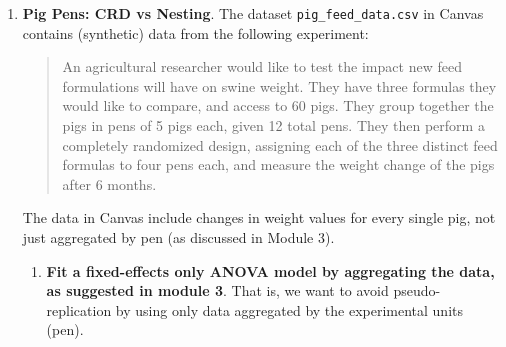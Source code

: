 \documentclass[10pt,twoside]{article}\usepackage[]{graphicx}\usepackage[dvipsnames,svgnames,table]{xcolor}
\makeatletter
\newcommand{\hlsng}[1]{\textcolor[rgb]{0.192,0.494,0.8}{#1}}%
\newcommand{\hlcom}[1]{\textcolor[rgb]{0.678,0.584,0.686}{\textit{#1}}}%
\newcommand{\hldef}[1]{\textcolor[rgb]{0.345,0.345,0.345}{#1}}%
\newcommand{\hlkwb}[1]{\textcolor[rgb]{0.69,0.353,0.396}{#1}}%
\newcommand{\hlkwd}[1]{\textcolor[rgb]{0.737,0.353,0.396}{\textbf{#1}}}%
\newenvironment{kframe}{%
 \def\at@end@of@kframe{}%
 \ifinner\ifhmode%
  \def\at@end@of@kframe{\end{minipage}}%
  \begin{minipage}{\columnwidth}%
 \fi\fi%
 \def\FrameCommand##1{\hskip\@totalleftmargin \hskip-\fboxsep
 \colorbox{shadecolor}{##1}\hskip-\fboxsep
     \hskip-\linewidth \hskip-\@totalleftmargin \hskip\columnwidth}%
 \MakeFramed {\advance\hsize-\width
   \@totalleftmargin\z@ \linewidth\hsize
   \@setminipage}}%
 {\par\unskip\endMakeFramed%
 \at@end@of@kframe}
\newenvironment{knitrout}{}{} %
\makeatother
\begin{document}
\begin{enumerate}
\begin{enumerate}
 \item The dataset \texttt{nestedDesignData.csv} contains 72 observations generated from this exact design. Load the data and use \texttt{lmer()} from the \texttt{lme4} package to fit the mixed-effects model you specified in part (a). Print the summary of the model, and analyze the fixed treatment effects using the \texttt{anova()}. \textit{\textbf{Hint:} Ensure your categorical variables are formatted as factors in R before fitting the model, and use the colon operator \texttt{:} to construct unique nested groupings. Also, you need to load \texttt{lmerTest} prior to fitting the model for \texttt{anova()} to work.}

\begin{knitrout}
\color{fgcolor}\begin{kframe}
\begin{alltt}
\hlkwd{library}\hldef{(lme4)}
\hlkwd{library}\hldef{(lmerTest)}

\hldef{...} \hlkwb{<-} \hlkwd{read.csv}\hldef{(}\hlsng{"nestedDesignData.csv"}\hldef{)}

\hlcom{# Fit the model}
\hldef{mod1C} \hlkwb{<-} \hlkwd{lmer}\hldef{(...)}
\hldef{...}
\end{alltt}
\end{kframe}
\end{knitrout}
  
  \end{enumerate}
  
  \item \textbf{Pig Pens: CRD vs Nesting}.
  The dataset \texttt{pig\_feed\_data.csv} in Canvas contains (synthetic) data from the following experiment:
  
  \begin{quote}
    An agricultural researcher would like to test the impact new feed formulations will have on swine weight.
    They have three formulas they would like to compare, and access to 60 pigs.
    They group together the pigs in pens of 5 pigs each, given 12 total pens.
    They then perform a completely randomized design, assigning each of the three distinct feed formulas to four pens each, and measure the weight change of the pigs after 6 months.
  \end{quote}

The data in Canvas include changes in weight values for every single pig, not just aggregated by pen (as discussed in Module 3).

\begin{enumerate}
  \item \textbf{Fit a fixed-effects only ANOVA model by aggregating the data, as suggested in module 3}.
  That is, we want to avoid pseudo-replication by using only data aggregated by the experimental units (pen).


\end{enumerate}
\end{enumerate}
\end{document}
